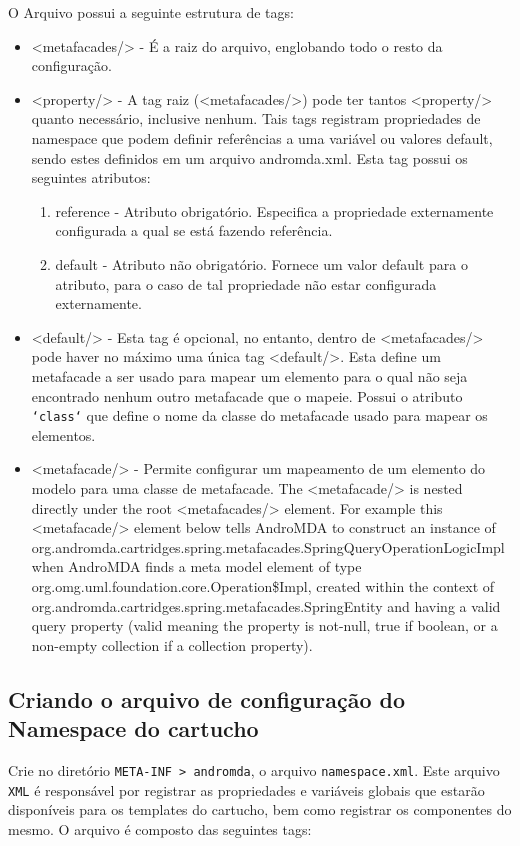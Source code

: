O Arquivo possui a seguinte estrutura de tags:

\begin{itemize}
  \item <metafacades/> - É a raiz do arquivo, englobando todo o resto da 
  configuração. 
  \item <property/> - A tag raiz (<metafacades/>) pode ter tantos <property/>
  quanto necessário, inclusive nenhum. Tais tags registram propriedades
  de namespace que podem definir referências a uma variável ou valores default,
  sendo estes definidos em um arquivo andromda.xml. Esta tag possui os seguintes
  atributos:
  \begin{enumerate}
    \item reference - Atributo obrigatório. Especifica a propriedade
    externamente configurada a qual se está fazendo referência.
    \item default - Atributo não obrigatório. Fornece um valor default para o
    atributo, para o caso de tal propriedade não estar configurada externamente.
  \end{enumerate}
  
  \item <default/> - Esta tag é opcional, no entanto, dentro de <metafacades/>
  pode haver no máximo uma única tag <default/>. Esta define um metafacade a ser
  usado para mapear um elemento para o qual não seja encontrado nenhum outro
  metafacade que o mapeie. Possui o atributo \texttt{`class`} que define o nome
  da classe do metafacade usado para mapear os elementos. 
  \item <metafacade/> - Permite configurar um mapeamento de um elemento do
  modelo para uma classe de metafacade. The <metafacade/> is nested directly
  under the root <metafacades/> element. For example this <metafacade/> element
  below tells AndroMDA to construct an instance of
  org.andromda.cartridges.spring.metafacades.SpringQueryOperationLogicImpl when
  AndroMDA finds a meta model element of type
  org.omg.uml.foundation.core.Operation\$Impl, created within the context of
  org.andromda.cartridges.spring.metafacades.SpringEntity and having a valid
  query property (valid meaning the property is not-null, true if boolean, or a
  non-empty collection if a collection property).
\end{itemize}

\subsection{Criando o arquivo de configuração do Namespace do cartucho}
Crie no diretório \texttt{META-INF > andromda}, o arquivo
\texttt{namespace.xml}. Este arquivo \texttt{XML} é responsável por registrar as
propriedades e variáveis globais que estarão disponíveis para os templates do
cartucho, bem como registrar os componentes do mesmo. O arquivo é composto das
seguintes tags:

